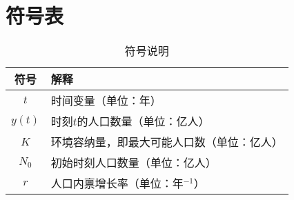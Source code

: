 \section{符号表}\label{sec:Notation}

\begin{table}[H]
    \centering
    \caption{符号说明}
    \begin{tabular}{cl}
        \toprule
        符号 & 解释 \\
        \midrule
        $t$   & 时间变量（单位：年） \\
        $y(t)$ & 时刻$t$的人口数量（单位：亿人） \\
        $K$    & 环境容纳量，即最大可能人口数（单位：亿人） \\
        $N_0$  & 初始时刻人口数量（单位：亿人） \\
        $r$    & 人口内禀增长率（单位：年$^{-1}$） \\
        \bottomrule
    \end{tabular}
    \label{tab:notation}
\end{table}
